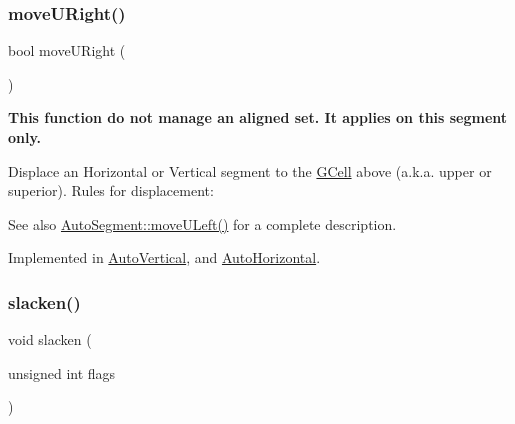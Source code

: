 \mbox{\label{classKatabatic_1_1AutoSegment_ad7fd54ca229fcf5ccd99f87b019b9cbc}} 
\subsubsection{\texorpdfstring{move\+U\+Right()}{moveURight()}}
{\footnotesize\ttfamily bool move\+U\+Right (\begin{DoxyParamCaption}{ }\end{DoxyParamCaption})\hspace{0.3cm}{\ttfamily [pure virtual]}}

{\bfseries This function do not manage an aligned set. It applies on {\ttfamily this} segment only.}

Displace an Horizontal or Vertical segment to the \hyperlink{classKatabatic_1_1GCell}{G\+Cell} above (a.\+k.\+a. upper or superior). Rules for displacement\+:

\begin{DoxySeeAlso}{See also}
\hyperlink{classKatabatic_1_1AutoSegment_af8ca7b17e952f4b599aeeb2f4e5be395}{Auto\+Segment\+::move\+U\+Left()} for a complete description. 
\end{DoxySeeAlso}


Implemented in \hyperlink{classKatabatic_1_1AutoVertical_aa469e37853e31f8b1bc817518c896d62}{Auto\+Vertical}, and \hyperlink{classKatabatic_1_1AutoHorizontal_aa469e37853e31f8b1bc817518c896d62}{Auto\+Horizontal}.

\mbox{\label{classKatabatic_1_1AutoSegment_a1fbc0adb4c0b14632edc7c55f028cd4b}} 
\subsubsection{\texorpdfstring{slacken()}{slacken()}}
{\footnotesize\ttfamily void slacken (\begin{DoxyParamCaption}\item[{unsigned int}]{flags }\end{DoxyParamCaption})}

